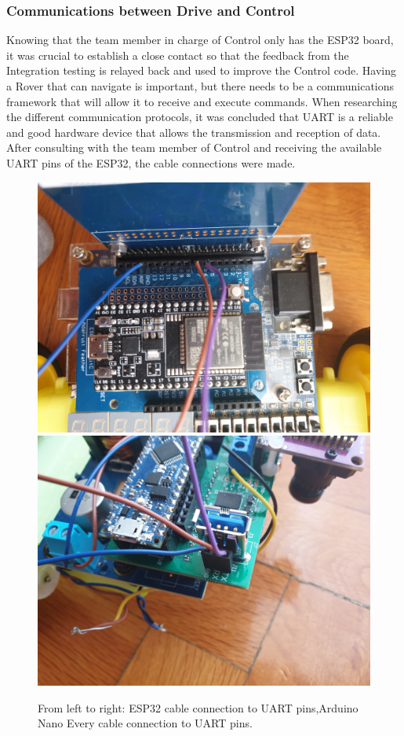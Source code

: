 \documentclass[a4paper]{article}
\begin{document}
\subsubsection{Communications between Drive and Control}
Knowing that the team member in charge of Control only has the ESP32 board, it was crucial to establish a close contact so that the feedback from the Integration testing is relayed back and used to improve the Control code.
Having a Rover that can navigate is important, but there needs to be a communications framework that will allow it to receive and execute commands. When researching the different communication protocols, it was concluded that UART is a reliable and good hardware device that allows the transmission and reception of data. After consulting with the team member of Control and receiving the available UART pins of the ESP32, the cable connections were made. 
\begin{figure}[H]
    \centering
    \includegraphics[scale=0.05, angle = 180]{./images/ESP32_UART.jpg}
    \includegraphics[scale=0.05, angle =  180]{./images/Arduino_UART.jpg}
    \vspace{-10pt}
    \caption{From left to right: ESP32 cable connection to UART pins,Arduino Nano Every cable connection to UART pins.}
    \vspace{-10pt}
    \label{image:UART}
\end{figure}
\end{document}
